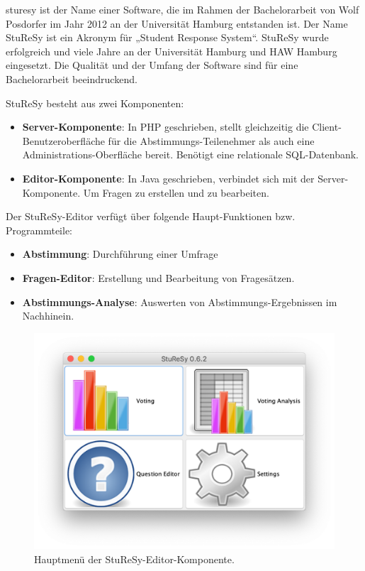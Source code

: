 \ac{sturesy} ist der Name einer Software, die im Rahmen der Bachelorarbeit von Wolf Posdorfer im Jahr 2012 an der Universität Hamburg entstanden ist. Der Name StuReSy ist ein Akronym für „Student Response System“. StuReSy wurde erfolgreich und viele Jahre an der Universität Hamburg und HAW Hamburg eingesetzt. Die Qualität und der Umfang der Software sind für eine Bachelorarbeit beeindruckend.

StuReSy besteht aus zwei Komponenten:
\begin{itemize}
    \item \textbf{Server-Komponente}: In PHP geschrieben, stellt gleichzeitig die Client-Benutzeroberfläche für die Abstimmungs-Teilenehmer als auch eine Administrations-Oberfläche bereit. Benötigt eine relationale SQL-Datenbank.
    \item \textbf{Editor-Komponente}: In Java geschrieben, verbindet sich mit der Server-Komponente. Um Fragen zu erstellen und zu bearbeiten.
\end{itemize}

Der StuReSy-Editor verfügt über folgende Haupt-Funktionen bzw. Programmteile:
\begin{itemize}
    \item \textbf{Abstimmung}: Durchführung einer Umfrage
    \item \textbf{Fragen-Editor}: Erstellung und Bearbeitung von Fragesätzen.
    \item \textbf{Abstimmungs-Analyse}: Auswerten von Abstimmungs-Ergebnissen im Nachhinein.
\end{itemize}

\begin{figure}[H]
    \includegraphics[width=16cm]{chapter/bewertung/bilder/StuReSy_Hauptmenue.png}
    \centering
    \caption{Hauptmenü der StuReSy-Editor-Komponente.}
    \label{Abbildung 2.1}
\end{figure}


